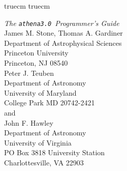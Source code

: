 \nonstopmode
{}
\setlength{\textheight}{9.0in}
\setlength{\textwidth}{6.5in}
 truecm
 truecm


\newcommand{\ath}{{\tt athena3.0}}

\newcommand{\Dt}[0]{\bigtriangleup t}
\newcommand{\Dx}[0]{\bigtriangleup x}
\makeatletter                                            %
\def\plotone#1{\centering \leavevmode                    %
\epsfxsize=\columnwidth \epsfbox{#1}}                    %
\def\plotone_reduction#1#2{\centering \leavevmode        %
\epsfxsize=#2\columnwidth \epsfbox{#1}}                  %
\def\plottwo#1#2{\centering \leavevmode                  %
\epsfxsize=.45\columnwidth \epsfbox{#1} \hfil            %
\epsfxsize=.45\columnwidth \epsfbox{#2}}                 %
\def\plotfiddle#1#2#3#4#5#6#7{\centering \leavevmode     %
\vbox to#2{\rule{0pt}{#2}}                               %
\special{psfile=#1 voffset=#7 hoffset=#6 vscale=#5 hscale=#4 angle=#3}} %
\makeatother



\begin{center}
{\huge {\it The \ath\ Programmer's Guide }} \vspace{1in} \\
{\Large James M. Stone, Thomas A. Gardiner} \\
{\large Department of Astrophysical Sciences \\ Princeton University \\
Princeton, NJ 08540} \vspace{0.5in} \\
{\Large Peter J. Teuben} \\
{\large Department of Astronomy \\ University of
Maryland \\ College Park MD 20742-2421} \vspace{0.5in} \\
and \vspace{0.5in} \\
{\Large John F. Hawley} \\
{\large Department of Astronomy \\ University of
Virginia \\ PO Box 3818 University Station \\ Charlottesville, VA 22903} \vspace{1in} \\
\end{center}
\newpage

